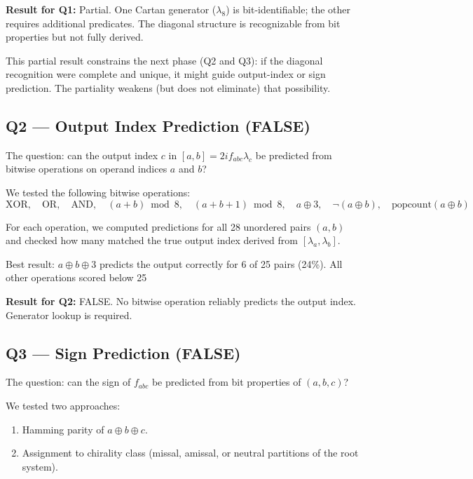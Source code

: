 \documentclass[11pt,a4paper]{article}
\begin{document}
\textbf{Result for Q1:} Partial. One Cartan generator ($\lambda_8$) is bit-identifiable; the other requires additional predicates. The diagonal structure is recognizable from bit properties but not fully derived.

This partial result constrains the next phase (Q2 and Q3): if the diagonal recognition were complete and unique, it might guide output-index or sign prediction. The partiality weakens (but does not eliminate) that possibility.

\subsection{Q2 — Output Index Prediction (FALSE)}

The question: can the output index $c$ in $[a, b] = 2i f_{abc} \lambda_c$ be predicted from bitwise operations on operand indices $a$ and $b$?

We tested the following bitwise operations:
\begin{equation}
\text{XOR}, \quad \text{OR}, \quad \text{AND}, \quad (a+b) \bmod 8, \quad (a+b+1) \bmod 8, \quad a \oplus 3, \quad \neg(a \oplus b), \quad \text{popcount}(a \oplus b)
\end{equation}

For each operation, we computed predictions for all 28 unordered pairs $(a, b)$ and checked how many matched the true output index derived from $[\lambda_a, \lambda_b]$.

Best result: $a \oplus b \oplus 3$ predicts the output correctly for 6 of 25 pairs (24\%). All other operations scored below 25%

\textbf{Result for Q2:} FALSE. No bitwise operation reliably predicts the output index. Generator lookup is required.

\subsection{Q3 — Sign Prediction (FALSE)}

The question: can the sign of $f_{abc}$ be predicted from bit properties of $(a, b, c)$?

We tested two approaches:
\begin{enumerate}
  \item Hamming parity of $a \oplus b \oplus c$.
  \item Assignment to chirality class (missal, amissal, or neutral partitions of the root system).
\end{enumerate}
\end{document}
